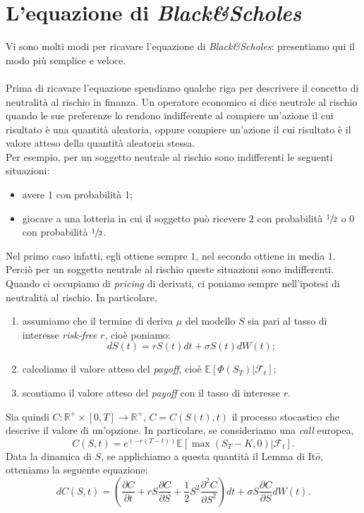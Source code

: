 \documentclass[a4paper,10pt]{report}
\newcommand{\der}[2]{\frac{\partial #1}{\partial #2}}
\newcommand{\dder}[2]{\frac{\partial^2 #1}{\partial #2^2}}
\theoremstyle{plain}
\theoremstyle{definition}
\theoremstyle{remark}
\begin{document}
\section{L'equazione di \emph{Black\&Scholes}}
Vi sono molti modi per ricavare l'equazione di \emph{Black\&Scholes}: presentiamo qui il modo pi\`u semplice e veloce.\\\\Prima di ricavare l'equazione spendiamo qualche riga per descrivere il concetto di neutralit\`a al rischio in finanza. Un operatore economico si dice neutrale al rischio quando le sue preferenze lo rendono indifferente al compiere un'azione il cui risultato \`e una quantit\`a aleatoria, oppure compiere un'azione il cui risultato \`e il valore atteso della quantit\`a aleatoria stessa.\\Per esempio, per un soggetto neutrale al rischio sono indifferenti le seguenti situazioni:
\begin{itemize}
\item avere $1$\officialeuro$ $ con probabilit\`a 1;
\item giocare a una lotteria in cui il soggetto pu\`o ricevere $2$\officialeuro$ $ con probabilit\`a $\sfrac{1}{2}$ o $0$\officialeuro$ $ con probabilit\`a $\sfrac{1}{2}$.
\end{itemize}
Nel primo caso infatti, egli ottiene sempre $1$\officialeuro$ $, nel secondo ottiene in media $1$\officialeuro$ $. Perci\`o per un soggetto neutrale al rischio queste situazioni sono indifferenti.\\Quando ci occupiamo di \emph{pricing} di derivati, ci poniamo sempre nell'ipotesi di neutralit\`a al rischio. In particolare,
\begin{enumerate}
\item assumiamo che il termine di deriva $\mu$ del modello $S$ sia pari al tasso di interesse \emph{risk-free} $r$, cio\`e poniamo: $$dS(t)=rS(t)dt+\sigma S(t)dW(t);$$
\item calcoliamo il valore atteso del \emph{payoff}, cio\`e $\mathbb{E}\left[\Phi(S_T)|\mathcal{F}_t\right]$;
\item scontiamo il valore atteso del \emph{payoff} con il tasso di interesse $r$.
\end{enumerate}
Sia quindi $C:\mathbb{R}^+\times[0,T]\rightarrow\mathbb{R}^+$, $C=C(S(t),t)$ il processo stocastico che descrive il valore di un'opzione. In particolare, se consideriamo una \emph{call} europea,
$$C(S,t)=e^{(-r(T-t))}\mathbb{E}\left[\max(S_T-K,0)|\mathcal{F}_t\right].$$
Data la dinamica di $S$, se applichiamo a questa quantit\`a il Lemma di It$\hat{o}$, otteniamo la seguente equazione: $$dC(S,t)=\left(\der{C}{t}+r S \der{C}{S} +\frac{1}{2}S^2\dder{C}{S}\right)dt+\sigma S \der{C}{S}dW(t).$$
\end{document}
